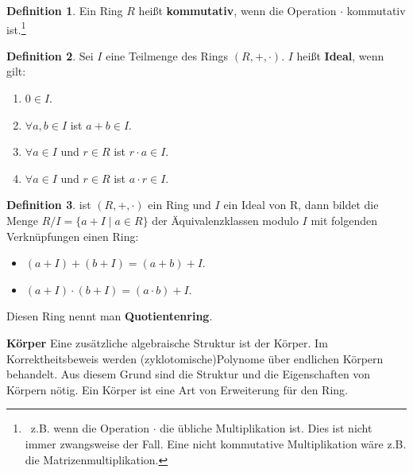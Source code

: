 \documentclass[12pt,oneside]{article}
\theoremstyle{remark}
\theoremstyle{definition}
\newtheorem{definition}{Definition}[section]
\begin{document}
\smallskip

\begin{definition}
Ein Ring $R$ heißt \textbf{kommutativ}, wenn die Operation $\cdot$ kommutativ ist.\footnote{ $\,$ z.B. wenn die Operation $\cdot$ die übliche Multiplikation ist. Dies ist nicht immer zwangsweise der Fall. Eine nicht kommutative Multiplikation wäre z.B. die Matrizenmultiplikation.}
\end{definition}

\smallskip




\smallskip


\begin{definition}
Sei $I$ eine Teilmenge des Rings $(R,+,\cdot)$. $I$ heißt \textbf{Ideal}, wenn gilt:
\begin{enumerate}
    \item $0 \in I$.
    \item $\forall a,b \in I$ ist $a + b \in I$.
    \item $\forall a \in I$ und $r \in R$ ist $r \cdot a \in I$.
    \item $\forall a \in I$ und $r \in R$ ist $a \cdot r \in I$.
\end{enumerate}
\end{definition}

\smallskip 

\begin{definition}
ist $(R, +, \cdot)$ ein Ring und $I$ ein Ideal von R, dann bildet die Menge $R/I = \{ a + I \mid a \in R\}$ der Äquivalenzklassen modulo $I$ mit folgenden Verknüpfungen einen Ring:
\begin{itemize}
    \item $(a + I) + (b + I) = (a + b) + I$.
    \item $(a + I) \cdot (b + I) = (a \cdot b ) + I$.\newline
\end{itemize}
Diesen Ring nennt man \textbf{Quotientenring}. 
\end{definition}

\smallskip

\textbf{Körper}\newline
Eine zusätzliche algebraische Struktur ist der Körper. Im Korrektheitsbeweis werden (zyklotomische)Polynome über endlichen Körpern behandelt. Aus diesem Grund sind die Struktur und die Eigenschaften von Körpern nötig. Ein Körper ist eine Art von Erweiterung für den Ring.
\end{document}
